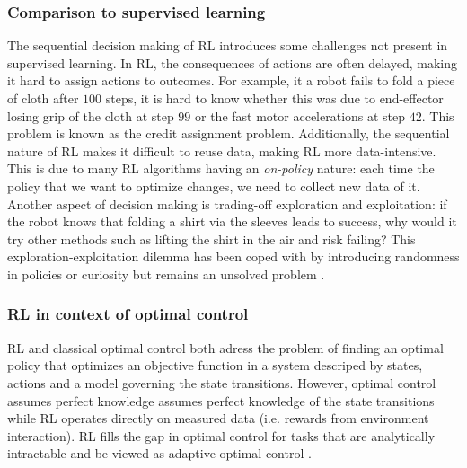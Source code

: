 \documentclass[\home/main.tex]{subfiles}
\begin{document}
\subsubsection{Comparison to supervised learning}
The sequential decision making of RL introduces some challenges not present in supervised learning.
In RL, the consequences of actions are often delayed, making it hard to assign actions to outcomes. For example, it a robot fails to fold a piece of cloth after $100$ steps, it is hard to know whether this was due to end-effector losing grip of the cloth at step $99$ or the fast motor accelerations at step $42$. This problem is known as the credit assignment problem.
Additionally, the sequential nature of RL makes it difficult to reuse data, making RL more data-intensive. This is due to many RL algorithms having an \emph{on-policy} nature: each time the policy that we want to optimize changes, we need to collect new data of it.
Another aspect of decision making is trading-off exploration and exploitation: if the robot knows that folding a shirt via the sleeves leads to success, why would it try other methods such as lifting the shirt in the air and risk failing? This exploration-exploitation dilemma has been coped with by introducing randomness in policies or curiosity \autocite{pathak2017curiosity} but remains an unsolved problem \autocite{Sutton2018}.

\subsubsection{RL in context of optimal control}
\Gls{RL} and classical optimal control both adress the problem of finding an optimal policy that optimizes an objective function in a system descriped by states, actions and a model governing the state transitions. However, optimal control assumes perfect knowledge assumes perfect knowledge of the state transitions while RL operates directly on measured data (i.e. rewards from environment interaction). RL fills the gap in optimal control for tasks that are analytically intractable and be viewed as adaptive optimal control \autocite{sutton1992reinforcement}.
\end{document}
